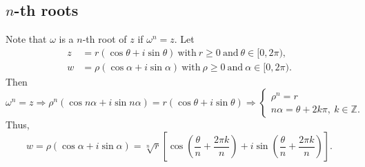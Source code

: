 \documentclass[12pt,openany]{book}
\theoremstyle{definition}
\newcommand{\Z}{\mathbb{Z}}
\newcommand{\of}[1]{\left( #1 \right)}
\begin{document}
	\subsection{$n$-th roots}
	Note that $\omega$ is a $n$-th root of $z$ if $\omega^n=z$. Let \begin{align*}
	z&=r\of{\cos\theta+i\sin\theta}\ \text{with}\ r\geq 0\ \text{and}\ \theta\in[0,2\pi),\\
	w&=\rho\of{\cos\alpha+i\sin\alpha}\ \text{with}\ \rho\geq 0\ \text{and}\ \alpha\in[0,2\pi).
	\end{align*} Then \[
	\omega^n=z\Rightarrow \rho^n(\cos n\alpha+i\sin n\alpha)=r\of{\cos\theta+i\sin\theta}\Rightarrow\begin{cases}
	\rho^n=r\\
	n\alpha=\theta+2k\pi,\ k\in\Z.
	\end{cases}
	\] Thus, \[
	w=\rho\of{\cos\alpha+i\sin\alpha}=\boxed{\sqrt[n]{r}\left[\cos\of{\frac{\theta}{n}+\frac{2\pi k}{n}}+i\sin\of{\frac{\theta}{n}+\frac{2\pi k}{n}}\right]}.
	\]
	\vspace{8pt}
\end{document}
